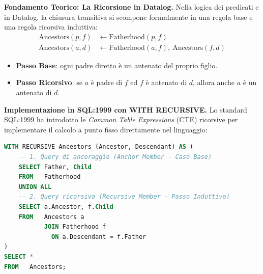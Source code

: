 \documentclass[12pt]{extarticle}
\begin{document}
\medskip
\noindent \textbf{Fondamento Teorico: La Ricorsione in Datalog.} Nella logica dei predicati e in Datalog, la chiusura transitiva si scompone formalmente in una regola base e una regola ricorsiva induttiva:
\begin{align*}
\text{Ancestors}(p, f) & \leftarrow \text{Fatherhood}(p, f) \\
\text{Ancestors}(a, d) & \leftarrow \text{Fatherhood}(a, f), \ \text{Ancestors}(f, d)
\end{align*}
\begin{itemize}
    \item \textbf{Passo Base}: ogni padre diretto è un antenato del proprio figlio.
    \item \textbf{Passo Ricorsivo}: se $a$ è padre di $f$ ed $f$ è antenato di $d$, allora anche $a$ è un antenato di $d$.
\end{itemize}

\medskip
\noindent \textbf{Implementazione in SQL:1999 con WITH RECURSIVE.} Lo standard SQL:1999 ha introdotto le \textit{Common Table Expressions} (CTE) ricorsive per implementare il calcolo a punto fisso direttamente nel linguaggio:

\begin{lstlisting}[language=SQL, caption={Calcolo completo degli antenati tramite CTE ricorsiva}]
WITH RECURSIVE Ancestors (Ancestor, Descendant) AS (
    -- 1. Query di ancoraggio (Anchor Member - Caso Base)
    SELECT Father, Child
    FROM   Fatherhood
    UNION ALL
    -- 2. Query ricorsiva (Recursive Member - Passo Induttivo)
    SELECT a.Ancestor, f.Child
    FROM   Ancestors a
           JOIN Fatherhood f 
             ON a.Descendant = f.Father
)
SELECT *
FROM   Ancestors;
\end{lstlisting}
\end{document}
